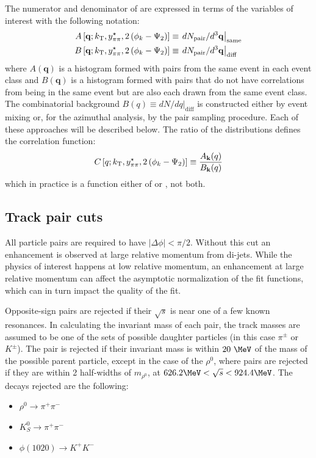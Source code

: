 The numerator and denominator of \Eqn{\ref{eq:corr_deff}} are expressed in terms of the variables of interest with the following notation:
\begin{align}
  A\left[\mathbf{q};k_\mathrm{T}, y^{\star}_{\pi\pi}, 2\left(\phi_{k}-\Psi_{2}\right)\right] &\equiv \left. dN_\textrm{pair}/d^3 \mathbf{q} \right|_{\textrm{same}} \\
  B\left[\mathbf{q};k_\mathrm{T}, y^{\star}_{\pi\pi}, 2\left(\phi_{k}-\Psi_{2}\right)\right] &\equiv \left. dN_\textrm{pair}/d^3 \mathbf{q} \right|_{\textrm{diff}}
\end{align}
where $A(\mathbf{q})$ is a histogram formed with pairs from the same event in each event class and $B(\mathbf{q})$ is a histogram formed with pairs that do not have correlations from being in the same event but are also each drawn from the same event class.
The combinatorial background $B(q) \equiv \left. dN/dq \right|_{\textrm{diff}}$ is constructed either by event mixing or, for the azimuthal analysis, by the pair sampling procedure.
Each of these approaches will be described below.
The ratio of the distributions defines the correlation function:
\begin{equation}
  \label{eq:same_over_mixed}
  C\left[q;k_\mathrm{T}, y^{\star}_{\pi\pi}, 2\left(\phi_{k}-\Psi_{2}\right)\right] \equiv \frac{A_{\mathbf{k}}(q)}{B_{\mathbf{k}}(q)}
\end{equation}
which in practice is a function either of \kys or \tdpk, not both.

\subsection{Track pair cuts}
All particle pairs are required to have $\left| \Delta \phi \right| < \pi/2$.
Without this cut an enhancement is observed at large relative momentum from di-jets.
While the physics of interest happens at low relative momentum, an enhancement at large relative momentum can affect the asymptotic normalization of the fit functions, which can in turn impact the quality of the fit.

Opposite-sign pairs are rejected if their $\sqrt{s}$ is near one of a few known resonances.
In calculating the invariant mass of each pair, the track masses are assumed to be one of the sets of possible daughter particles (in this case $\pi^{\pm}$ or $K^{\pm}$).
The pair is rejected if their invariant mass is within $20~\MeV$ of the mass of the possible parent particle, except in the case of the $\rho^{0}$, where pairs are rejected if they are within 2 half-widths of $m_{\rho^{0}}$, at $626.2 \MeV < \sqrt{s} < 924.4 \MeV$.
The decays rejected are the following:
\begin{itemize}
\item
  $\rho^{0} \rightarrow \pi^{+} \pi^{-}$
\item
  $K^{0}_{S} \rightarrow \pi^{+} \pi^{-}$
\item
  $\phi(1020) \rightarrow K^{+} K^{-}$
\end{itemize}

